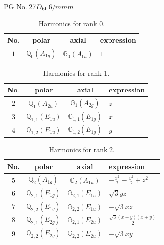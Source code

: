 \documentclass[fleqn,8pt,landscape]{jsarticle}
\begin{document}
\setcounter{MaxMatrixCols}{32}

\renewcommand{\tablename}{Table~}
\renewcommand{\figurename}{Figure~}
\begin{center}
\LARGE
PG No. 27\quad$D_{\rm 6h}$\quad$6/mmm$\quad[ hexagonal ]
\end{center}
\begin{table}[ht!]
\begin{center}
\caption{Harmonics for rank 0.}
\renewcommand{\arraystretch}{1.3}
\begin{tabular}{cccl} \hline \hline
No. & polar & axial & expression \\ \hline
$ 1 $ & $ \mathbb{Q}_{0}(A_{1g}) $ & $ \mathbb{G}_{0}(A_{1u}) $ & $ 1 $ \\
 \hline \hline
\end{tabular}
\end{center}
\end{table}
\begin{table}[ht!]
\begin{center}
\caption{Harmonics for rank 1.}
\renewcommand{\arraystretch}{1.3}
\begin{tabular}{cccl} \hline \hline
No. & polar & axial & expression \\ \hline
$ 2 $ & $ \mathbb{Q}_{1}(A_{2u}) $ & $ \mathbb{G}_{1}(A_{2g}) $ & $ z $ \\
$ 3 $ & $ \mathbb{Q}_{1,1}(E_{1u}) $ & $ \mathbb{G}_{1,1}(E_{1g}) $ & $ x $ \\
$ 4 $ & $ \mathbb{Q}_{1,2}(E_{1u}) $ & $ \mathbb{G}_{1,2}(E_{1g}) $ & $ y $ \\
 \hline \hline
\end{tabular}
\end{center}
\end{table}
\begin{table}[ht!]
\begin{center}
\caption{Harmonics for rank 2.}
\renewcommand{\arraystretch}{1.3}
\begin{tabular}{cccl} \hline \hline
No. & polar & axial & expression \\ \hline
$ 5 $ & $ \mathbb{Q}_{2}(A_{1g}) $ & $ \mathbb{G}_{2}(A_{1u}) $ & $ - \frac{x^{2}}{2} - \frac{y^{2}}{2} + z^{2} $ \\
$ 6 $ & $ \mathbb{Q}_{2,1}(E_{1g}) $ & $ \mathbb{G}_{2,1}(E_{1u}) $ & $ \sqrt{3} y z $ \\
$ 7 $ & $ \mathbb{Q}_{2,2}(E_{1g}) $ & $ \mathbb{G}_{2,2}(E_{1u}) $ & $ - \sqrt{3} x z $ \\
$ 8 $ & $ \mathbb{Q}_{2,1}(E_{2g}) $ & $ \mathbb{G}_{2,1}(E_{2u}) $ & $ \frac{\sqrt{3} \left(x - y\right) \left(x + y\right)}{2} $ \\
$ 9 $ & $ \mathbb{Q}_{2,2}(E_{2g}) $ & $ \mathbb{G}_{2,2}(E_{2u}) $ & $ - \sqrt{3} x y $ \\
 \hline \hline
\end{tabular}
\end{center}
\end{table}
\end{document}
